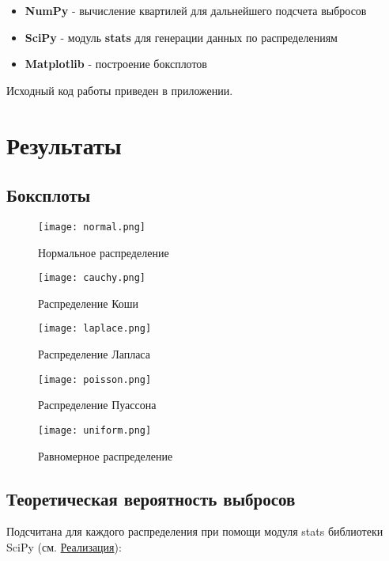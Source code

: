 \documentclass[12pt,a4paper]{article}
\begin{document}
\begin{itemize}
	\item \textbf{NumPy} - вычисление квартилей для дальнейшего подсчета выбросов
	\item \textbf{SciPy} - модуль \textbf{stats} для генерации данных по распределениям
	\item \textbf{Matplotlib} - построение боксплотов
\end{itemize}

Исходный код работы приведен в приложении. 
\pagebreak

\section{Результаты}
\subsection{Боксплоты}
\begin{figure}[h!]
	\centering
	\texttt{[image: normal.png]}
	\caption{Нормальное распределение}
	\label{fig:image}
\end{figure}

\begin{figure}[h!]\label{4}
	\centering
	\texttt{[image: cauchy.png]}
	\caption{Распределение Коши}
	\label{fig:image:cauchy}
\end{figure}

\pagebreak

\begin{figure}[h!]
	\centering
	\texttt{[image: laplace.png]}
	\caption{Распределение Лапласа}
	\label{fig:image}
\end{figure}

\begin{figure}[h!]
	\centering
	\texttt{[image: poisson.png]}
	\caption{Распределение Пуассона}
	\label{fig:image}
\end{figure}

\pagebreak

\begin{figure}[h!]
	\centering
	\texttt{[image: uniform.png]}
	\caption{Равномерное распределение}
	\label{fig:image}
\end{figure}
\pagebreak

\subsection{Теоретическая вероятность выбросов}
Подсчитана для каждого распределения при помощи модуля {stats} библиотеки {SciPy} (см. \hyperref[sec:impl]{Реализация}):
\end{document}
